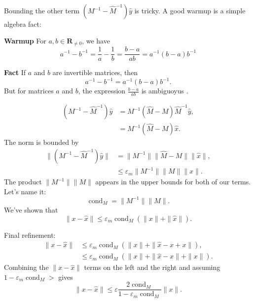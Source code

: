 \documentclass[usenames,dvipsnames,fleqn]{beamer}
\newcommand{\reals}{\mathbf{R}}
\DeclareMathOperator{\cond}{cond}
\theoremstyle{definition}
\begin{document}
\begin{frame}

Bounding the other term \( \left(M^{-1} - \widehat M^{-1} \right) \widehat y \) is tricky. A good warmup 
is a simple algebra fact:

\textbf{Warmup}  For \(a,b \in \reals_{\neq 0}\), we have
\[
   a^{-1} - b^{-1} = \frac{1}{a} - \frac{1}{b} = \frac{b-a}{a b} = a^{-1} (b - a) b^{-1}
\]


\textbf{Fact} If \(a\) and \(b\) are invertible matrices, then
\[
    a^{-1} - b^{-1} = a^{-1} (b - a) b^{-1}.
\]
But for matrices \(a\) and \(b\), the expression  \(\frac{b-a}{a b}\) is ambiguoyus .


\end{frame}
\begin{frame}
 \begin{align*}
    \left(M^{-1} - \widehat M^{-1} \right) \widehat y &= M^{-1} (\widehat M - M) \widehat M^{-1} \widehat y, \\
    &=   M^{-1} (\widehat M - M) \widehat x.
 \end{align*}
 The norm is bounded by
 \begin{align*}
  \| \left(M^{-1} - \widehat M^{-1} \right) \widehat y \| &= \| M^{-1} \| 
     \|  \widehat M - M \| \|\widehat x \|, \\
     &\leq  \varepsilon_m  \| M^{-1} \|  \| M \|  \|\widehat x \|.
 \end{align*} 
 The product  \(\| M^{-1} \|  \| M \| \) appears in the upper bounds for both of our terms. Let's name it:
 \[
    \cond_M = \| M^{-1} \|  \| M \|.
 \]
 We've shown that 
 \[
    \| x - \widehat x \| \leq \varepsilon_m \cond_M \left (\| x \| + \| \widehat x \| \right).
 \]
\end{frame}
\begin{frame}
Final refinement:
\begin{align*} 
    \| x - \widehat x \| & \leq \varepsilon_m \cond_M \left (\| x \| + \| \widehat x - x + x \| \right), \\
                &\leq  \varepsilon_m \cond_M \left (\| x \| + \| \widehat x - x  \| + \| x \| \right).
 \end{align*}
 Combining the \(\| x - \widehat x \| \) terms on the left and the right and assuming 
 \(1 - \varepsilon_m \cond_M   > \) gives
 \[
     \| x - \widehat x \| \leq \varepsilon \frac{2 \cond_M}{1 - \varepsilon_m \cond_M } \| x \| .
 \]
\end{frame}
\end{document}
